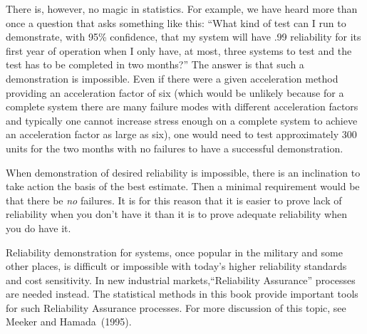 There is, however, no magic in statistics.  For example, we have
heard more than once a question that asks something like this:
``What kind of test can I run to demonstrate, with 95\% confidence,
that my system will have .99 reliability for its first year of
operation when I only have, at most, three systems to test and the
test has to be completed in two months?''  The answer is that such a
demonstration is impossible. Even if there were a given acceleration
method providing an acceleration factor of six (which would be
unlikely because for a complete system there are many failure modes
with different acceleration factors and typically one cannot
increase stress enough on a complete system to achieve an
acceleration factor as large as six), one would need to test
approximately 300 units for the two months with no failures to
have a successful demonstration.

When demonstration of desired reliability is impossible, there is an
inclination to take action the basis of the best estimate.  Then a
minimal requirement would be that there be {\em no} failures.  It is
for this reason that it is easier to prove lack of reliability when
you don't have it than it is to prove adequate reliability when you
do have it.

Reliability demonstration for systems, once popular in the military
and some other places, is difficult or impossible with today's
higher reliability standards and cost sensitivity. In new industrial
markets,``Reliability Assurance'' processes are needed instead. The
statistical methods in this book provide important tools for such
Reliability Assurance processes. For more discussion of this topic,
see Meeker and Hamada~(1995).
